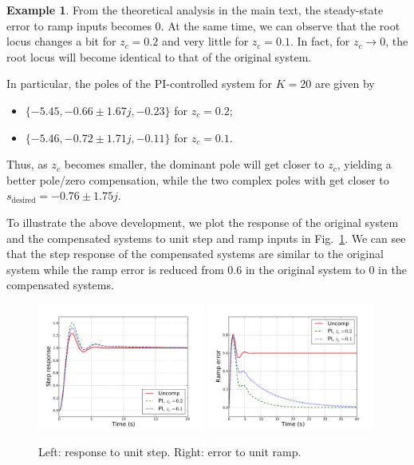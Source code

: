\documentclass[a4paper,11pt]{report}
\theoremstyle{definition}
\newcommand{\des}{\textrm{desired}}
\newtheorem{mdexample}{Example}
\newenvironment{example}%
  {\vspace{0.1cm}\begin{mdframed}[backgroundcolor=lightgray]\begin{mdexample}}%
  {\end{mdexample}\end{mdframed}\vspace{0.1cm}}
\begin{document}
\begin{example}
  From the theoretical analysis in the main text, the steady-state
  error to ramp inputs becomes 0. At the same time, we can observe
  that the root locus changes a bit for $z_c=0.2$ and very little for
  $z_c=0.1$. In fact, for $z_c\to 0$, the root locus will become
  identical to that of the original system. 
  
  In particular, the poles of the PI-controlled system for $K=20$ are
  given by 
  \begin{itemize}
  \item $\{-5.45,-0.66\pm1.67j,-0.23\}$ for $z_c=0.2$;
  \item $\{-5.46,-0.72\pm1.71j,-0.11\}$ for $z_c=0.1$.
  \end{itemize}

  Thus, as $z_c$ becomes smaller, the dominant pole will get closer to
  $z_c$, yielding a better pole/zero compensation, while the two
  complex poles with get closer to $s_\des=-0.76\pm1.75j$.

  To illustrate the above development, we plot the response of the
  original system and the compensated systems to unit step and ramp
  inputs in Fig.~\ref{fig:design-PI-resp}. We can see that the step
  response of the compensated systems are similar to the original
  system while the ramp error is reduced from 0.6 in the original
  system to 0 in the compensated systems.

  \begin{figure}[H]
    \centering
    \includegraphics[width=5.5cm]{fig/design-PI-resp.pdf}
    \includegraphics[width=5.5cm]{fig/design-PI-resp2.pdf}
    \caption{Left: response to unit step. Right: error to unit ramp.}
    \label{fig:design-PI-resp}
  \end{figure}

\end{example}
\end{document}
